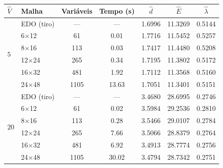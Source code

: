 \begin{tabular}{llccccc}
\toprule
$\hat V$ & Malha & Variáveis & Tempo (s) & $\hat d$ & $\hat E$ & $\hat\lambda$ \\
\midrule
\multirow{6}{*}{$5$} & EDO (tiro) & --- & --- & \num{1.6996} & \num{11.3269} & \num{0.5144} \\
 & 6$\times$12 & 61 & \num{0.01} & \num{1.7716} & \num{11.5452} & \num{0.5257} \\
 & 8$\times$16 & 113 & \num{0.03} & \num{1.7417} & \num{11.4480} & \num{0.5208} \\
 & 12$\times$24 & 265 & \num{0.34} & \num{1.7195} & \num{11.3802} & \num{0.5172} \\
 & 16$\times$32 & 481 & \num{1.92} & \num{1.7112} & \num{11.3568} & \num{0.5160} \\
 & 24$\times$48 & 1105 & \num{13.63} & \num{1.7051} & \num{11.3401} & \num{0.5151} \\
\midrule
\multirow{6}{*}{$20$} & EDO (tiro) & --- & --- & \num{3.4680} & \num{28.6995} & \num{0.2746} \\
 & 6$\times$12 & 61 & \num{0.02} & \num{3.5984} & \num{29.2536} & \num{0.2810} \\
 & 8$\times$16 & 113 & \num{0.28} & \num{3.5466} & \num{29.0107} & \num{0.2784} \\
 & 12$\times$24 & 265 & \num{7.66} & \num{3.5066} & \num{28.8379} & \num{0.2764} \\
 & 16$\times$32 & 481 & \num{6.92} & \num{3.4913} & \num{28.7774} & \num{0.2756} \\
 & 24$\times$48 & 1105 & \num{30.02} & \num{3.4794} & \num{28.7342} & \num{0.2751} \\
\bottomrule
\end{tabular}
